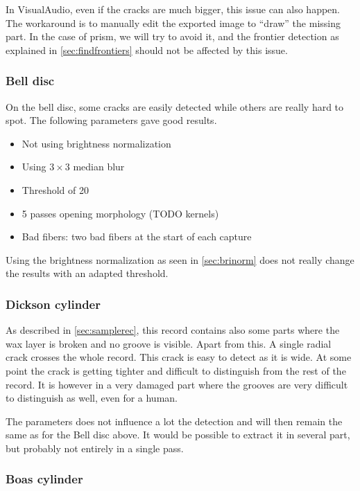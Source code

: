 In VisualAudio, even if the cracks are much bigger, this issue can also happen. The workaround is to manually edit the exported image to ``draw'' the missing part. In the case of \gls{prism}, we will try to avoid it, and the frontier detection as explained in \autoref{sec:findfrontiers} should not be affected by this issue.

\subsubsection{Bell disc}

On the bell disc, some cracks are easily detected while others are really hard to spot. The following parameters gave good results.

\begin{itemize}
\item Not using brightness normalization
\item Using $3 \times 3$ median blur
\item Threshold of 20
\item 5 passes opening morphology (TODO kernels)
\item Bad fibers: two bad fibers at the start of each capture
\end{itemize}

Using the brightness normalization as seen in \autoref{sec:brinorm} does not really change the results with an adapted threshold.

\subsubsection{Dickson cylinder}

As described in \autoref{sec:samplerec}, this record contains also some parts where the wax layer is broken and no groove is visible. Apart from this. A single radial crack crosses the whole record. This crack is easy to detect as it is wide. At some point the crack is getting tighter and difficult to distinguish from the rest of the record. It is however in a very damaged part where the grooves are very difficult to distinguish as well, even for a human.

The parameters does not influence a lot the detection and will then remain the same as for the Bell disc above. It would be possible to extract it in several part, but probably not entirely in a single pass.

\subsubsection{Boas cylinder}

